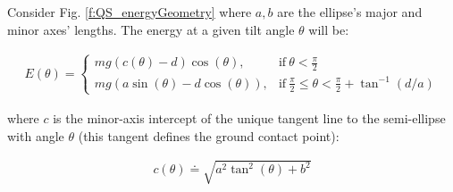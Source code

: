 \documentclass[letterpaper]{report}
\begin{document}
Consider Fig. \ref{f:QS_energyGeometry} where $a,b$ are the ellipse's major and minor axes' lengths.
The energy at a given tilt angle $\theta$ will be:

\begin{align}
  E(\theta) =
    \begin{cases}
      mg (c(\theta)-d) \cos(\theta), & \text{if}\ \theta < \frac{\pi}{2} \\
      mg (a \sin(\theta) - d \cos(\theta) ), & \text{if}\ \frac{\pi}{2} \leq \theta < \frac{\pi}{2} + \tan^{-1}(d/a)
    \end{cases}
  \label{eq:QSEnergy}
\end{align}

where $c$ is the minor-axis intercept of the unique tangent line to the semi-ellipse with angle $\theta$ (this tangent defines the ground contact point):

\begin{align}
  c(\theta) \doteq \sqrt{a^2 \tan^2(\theta) + b^2}
\end{align}
\end{document}
